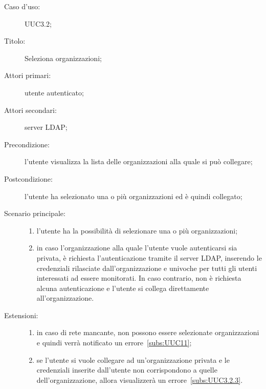 \documentclass[../../../analisi-dei-requisiti.tex]{subfiles}
\begin{document}
\begin{description}
  \item[Caso d’uso:] UUC3.2;
  \item[Titolo:] Seleziona organizzazioni;
  \item[Attori primari:] utente autenticato;
  \item[Attori secondari:] server LDAP;
  \item[Precondizione:] l'utente visualizza la lista delle organizzazioni alla quale si può collegare;
  \item[Postcondizione:] l'utente ha selezionato una o più organizzazioni ed è quindi collegato;
  \item[Scenario principale:]
        \begin{enumerate}
          \item l'utente ha la possibilità di selezionare una o più organizzazioni;
          \item in caso l'organizzazione alla quale l'utente vuole autenticarsi sia privata, è richiesta l'autenticazione tramite il server LDAP, inserendo le credenziali rilasciate dall'organizzazione e univoche per tutti gli utenti interessati ad essere monitorati. In caso contrario, non è richiesta alcuna autenticazione e l'utente si collega direttamente all'organizzazione.
        \end{enumerate}
  \item[Estensioni:]
        \begin{enumerate}
          \item in caso di rete mancante, non possono essere selezionate organizzazioni e quindi verrà notificato un errore~\ref{subs:UUC11};
          \item se l'utente si vuole collegare ad un'organizzazione privata e le credenziali inserite dall'utente non corrispondono a quelle dell'organizzazione, allora visualizzerà un errore~\ref{subs:UUC3.2.3}.
        \end{enumerate}
\end{description}
\end{document}
